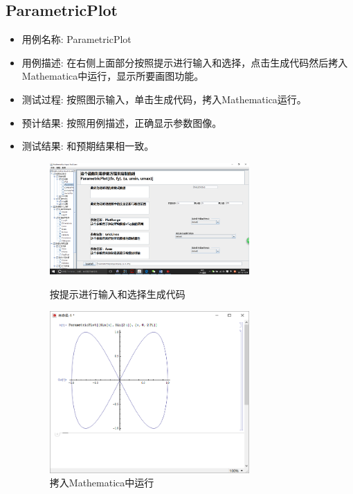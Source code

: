\documentclass[hyperref, UTF8
,bookmarksnumbered=true, oneside]{ctexbook}
\begin{document}
		\subsection{ParametricPlot} %
		\begin{itemize}
			\item 用例名称: ParametricPlot
			\item 用例描述: 在右侧上面部分按照提示进行输入和选择，点击生成代码然后拷入Mathematica中运行，显示所要画图功能。
			\item 测试过程: 按照图示输入，单击生成代码，拷入Mathematica运行。
			\item 预计结果: 按照用例描述，正确显示参数图像。
			\item 测试结果:	和预期结果相一致。

				\begin{figure}[!h]
	                \begin{minipage}[b]{0.45\textwidth}
	                \centering
	                \includegraphics[width=3in]{6.png}
	                \caption{按提示进行输入和选择生成代码}
	                \label{pic:MathPack}
	                \end{minipage}%
	                \hspace{0.1\textwidth}%
	                \begin{minipage}[b]{0.45\textwidth}
	                \centering
	                \includegraphics[width=3in]{7.png}
	                \caption{拷入Mathematica中运行}
	                \label{pic:GUIPack}
	                \end{minipage}
            	\end{figure}

		\end{itemize}
		
\end{document}
